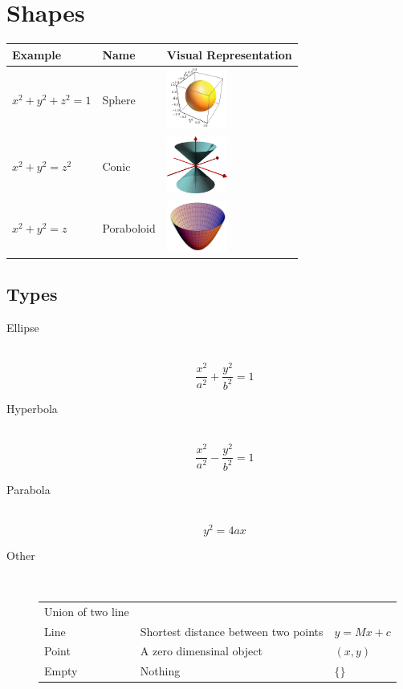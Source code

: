 \documentclass[11pt,twoside,a4paper]{article}
\begin{document}
  \section{Shapes}
    \begin{tabular}{l|l|l}
      \textbf{Example}  & \textbf{Name} & \textbf{Visual Representation} \\ \hline
      \(x^2+y^2+z^2=1\) & Sphere        & \includegraphics[width=2cm]{MSP195419f85bd4320b17g400004245ieica2347c33}\cite{sphere_graphic} \\
      \(x^2+y^2=z^2\)   & Conic         & \includegraphics[width=2cm]{DoubleCone} \\
      \(x^2+y^2=z\)     & Poraboloid    & \includegraphics[width=2cm]{Paraboloid_of_Revolution}  \\
    \end{tabular}
    
    \subsection{Types}
      \begin{description}
        \item[Ellipse] \hfill \\
          \[ \frac{x^2}{a^2} + \frac{y^2}{b^2} = 1 \]
        
        \item[Hyperbola] \hfill \\
          \[ \frac{x^2}{a^2} - \frac{y^2}{b^2} = 1 \]
        
        \item[Parabola] \hfill \\
          \[ y^2 = 4ax \]
        
        \item[Other] \hfill \\
          \begin{tabular}{l|l|l}
            Union of two line &                          & \(  \)       \\ %
            Line              & Shortest distance between two points & \( y=Mx+c \) \\
            Point             & A zero dimensinal object & \( (x,y) \)  \\
            Empty             & Nothing                  & \( \{\} \)   \\
          \end{tabular}
      \end{description}
    
\end{document}
